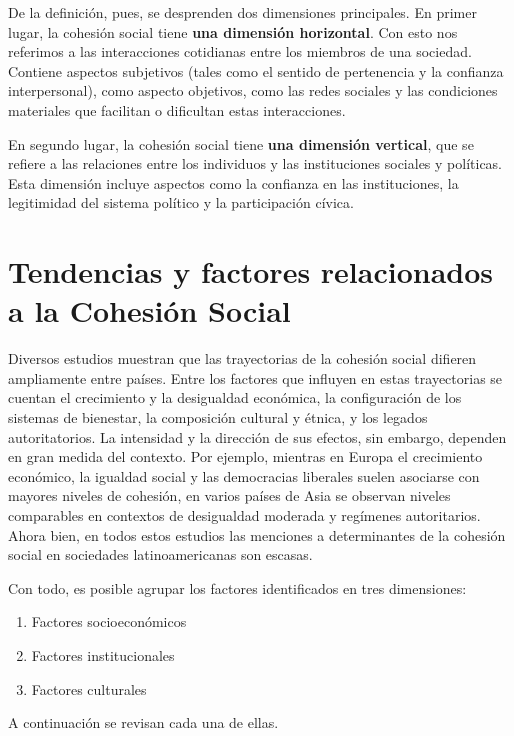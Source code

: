 \documentclass[
  letterpaper,
  DIV=11,
  numbers=noendperiod]{scrartcl}
\providecommand{\tightlist}{%
  \setlength{\itemsep}{0pt}\setlength{\parskip}{0pt}}\usepackage{longtable,booktabs,array}
\begin{document}
De la definición, pues, se desprenden dos dimensiones principales. En
primer lugar, la cohesión social tiene \textbf{una dimensión
horizontal}. Con esto nos referimos a las interacciones cotidianas entre
los miembros de una sociedad. Contiene aspectos subjetivos (tales como
el sentido de pertenencia y la confianza interpersonal), como aspecto
objetivos, como las redes sociales y las condiciones materiales que
facilitan o dificultan estas interacciones.

En segundo lugar, la cohesión social tiene \textbf{una dimensión
vertical}, que se refiere a las relaciones entre los individuos y las
instituciones sociales y políticas. Esta dimensión incluye aspectos como
la confianza en las instituciones, la legitimidad del sistema político y
la participación cívica.

\section{Tendencias y factores relacionados a la Cohesión
Social}\label{tendencias-y-factores-relacionados-a-la-cohesiuxf3n-social}

Diversos estudios muestran que las trayectorias de la cohesión social
difieren ampliamente entre países. Entre los factores que influyen en
estas trayectorias se cuentan el crecimiento y la desigualdad económica,
la configuración de los sistemas de bienestar, la composición cultural y
étnica, y los legados autoritatorios. La intensidad y la dirección de
sus efectos, sin embargo, dependen en gran medida del contexto. Por
ejemplo, mientras en Europa el crecimiento económico, la igualdad social
y las democracias liberales suelen asociarse con mayores niveles de
cohesión, en varios países de Asia se observan niveles comparables en
contextos de desigualdad moderada y regímenes autoritarios. Ahora bien,
en todos estos estudios las menciones a determinantes de la cohesión
social en sociedades latinoamericanas son escasas.

Con todo, es posible agrupar los factores identificados en tres
dimensiones:

\begin{enumerate}
\def\labelenumi{\arabic{enumi}.}
\tightlist
\item
  Factores socioeconómicos
\item
  Factores institucionales
\item
  Factores culturales
\end{enumerate}

A continuación se revisan cada una de ellas.
\end{document}
